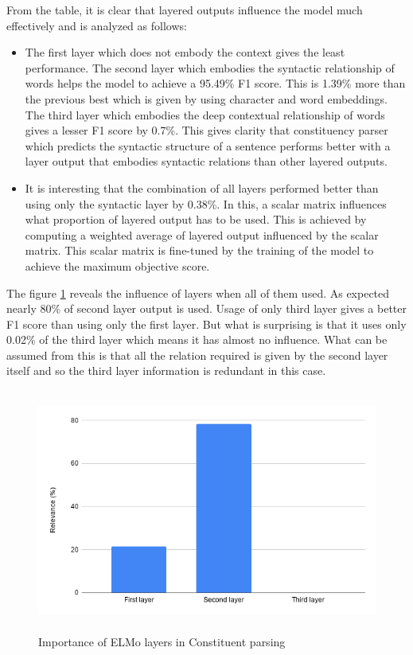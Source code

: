 \documentclass[a4paper, 11pt]{article}
\begin{document}
From the table, it is clear that layered outputs influence the model much effectively and is analyzed as follows:
\begin{itemize}
\item The first layer which does not embody the context gives the least performance. The second layer which embodies the syntactic relationship of words helps the model to achieve a 95.49\% F1 score. This is 1.39\% more than the previous best which is given by using character and word embeddings. The third layer which embodies the deep contextual relationship of words gives a lesser F1 score by 0.7\%. This gives clarity that constituency parser which predicts the syntactic structure of a sentence performs better with a layer output that embodies syntactic relations than other layered outputs. 
\item It is interesting that the combination of all layers performed better than using only the syntactic layer by 0.38\%. In this, a scalar matrix influences what proportion of layered output has to be used. This is achieved by computing a weighted average of layered output influenced by the scalar matrix. This scalar matrix is fine-tuned by the training of the model to achieve the maximum objective score. 
\end{itemize}

The figure \ref{fig:elmo-layers-relevance} reveals the influence of layers when all of them used. As expected nearly 80\% of second layer output is used. Usage of only third layer gives a better F1 score than using only the first layer. But what is surprising is that it uses only 0.02\% of the third layer which means it has almost no influence. What can be assumed from this is that all the relation required is given by the second layer itself and so the third layer information is redundant in this case. 

\begin{figure}[H]
    \centering
    \includegraphics[width=\textwidth,height=8cm,keepaspectratio=true]
    {elmo-layers-relevance.png}
    \caption{
        Importance of ELMo layers in Constituent parsing
    }
    \label{fig:elmo-layers-relevance}
\end{figure}
\end{document}
